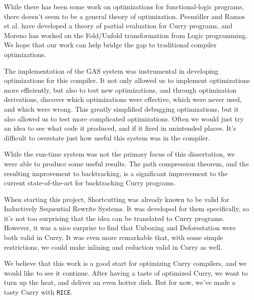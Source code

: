 \documentclass{book}
\newcommand{\rice}{\texttt{RICE}}
\theoremstyle{definition}
\begin{document}
While there has been some work on optimizations for functional-logic programs,
there doesn't seem to be a general theory of optimization.
Peem{\"o}ller and Ramos et al. \cite{peval, offlinePeval}
have developed a theory of partial evaluation for Curry programs,
and Moreno \cite{foldUnfold} has worked on the Fold/Unfold transformation from Logic programming.
We hope that our work can help bridge the gap to traditional compiler optimizations.

The implementation of the GAS system was instrumental in developing optimizations for this compiler.
It not only allowed us to implement optimizations more efficiently,
but also to test new optimizations,
and through optimization derivations,
discover which optimizations were effective,
which were never used, and which were wrong.
This greatly simplified debugging optimizations,
but it also allowed us to test more complicated optimizations.
Often we would just try an idea to see what code it produced,
and if it fired in unintended places.
It's difficult to overstate just how useful this system was in the compiler.

While the run-time system was not the primary focus of this dissertation,
we were able to produce some useful results.
The path compression theorem,
and the resulting improvement to backtracking,
is a significant improvement to the current state-of-the-art for backtracking Curry programs.

When starting this project, Shortcutting was already known
to be valid for Inductively Sequential Rewrite Systems.
It was developed for them specifically,
so it's not too surprising that the idea can be translated to Curry programs.
However, it was a nice surprise to find that
Unboxing and Deforestation were both valid in Curry.
It was even more remarkable that, with some simple restrictions,
we could make inlining and reduction valid in Curry as well.

We believe that this work is a good start for optimizing Curry compilers,
and we would like to see it continue.
After having a taste of optimized Curry, we want to turn up the heat,
and deliver an even hotter dish.
But for now, we've made a tasty Curry with \rice.


%
% 
% 
% 


\printindex


\end{document}
